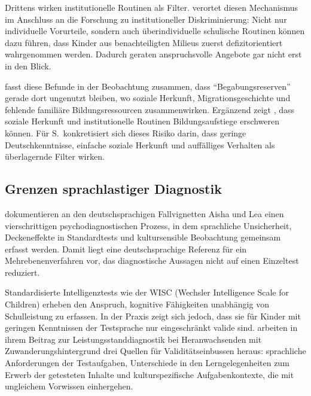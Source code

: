 \documentclass[ngerman, a4paper]{article}
\begin{document}
Drittens wirken institutionelle Routinen als Filter.
\textcite[S.\,58--62]{stamm2025vonuntennachoben} verortet diesen
Mechanismus im Anschluss an die Forschung zu institutioneller
Diskriminierung: Nicht nur individuelle Vorurteile, sondern auch
überindividuelle schulische Routinen können dazu führen, dass Kinder
aus benachteiligten Milieus zuerst defizitorientiert wahrgenommen
werden. Dadurch geraten anspruchsvolle Angebote gar nicht erst in den
Blick.

\textcite[S.\,576--585]{stamm2021fehlenderblick} fasst diese Befunde
in der Beobachtung zusammen, dass \enquote{Begabungsreserven} gerade
dort ungenutzt bleiben, wo soziale Herkunft, Migrationsgeschichte und
fehlende familiäre Bildungsressourcen zusammenwirken. Ergänzend zeigt
\textcite[S.\,36--37,\,58--62]{stamm2025vonuntennachoben}, dass
soziale Herkunft und institutionelle Routinen Bildungsaufstiege
erschweren können. Für S.\ konkretisiert sich dieses Risiko darin,
dass geringe Deutschkenntnisse, einfache soziale Herkunft und
auffälliges Verhalten als überlagernde Filter wirken.

\subsection{Grenzen sprachlastiger Diagnostik}

\textcite[S.\,239--249]{gauckreimann2021psychdiagnostik} dokumentieren an den
deutschsprachigen Fallvignetten Aisha und Lea einen vierschrittigen
psychodiagnostischen Prozess, in dem sprachliche Unsicherheit,
Deckeneffekte in Standardtests und kultursensible Beobachtung gemeinsam
erfasst werden. Damit liegt eine deutschsprachige Referenz für ein
Mehrebenenverfahren vor, das diagnostische Aussagen nicht auf einen
Einzeltest reduziert.

Standardisierte Intelligenztests wie der WISC (Wechsler Intelligence Scale
for Children) erheben den Anspruch, kognitive Fähigkeiten unabhängig von
Schulleistung zu erfassen. In der Praxis zeigt sich jedoch, dass sie für
Kinder mit geringen Kenntnissen der Testsprache nur eingeschränkt valide
sind. \textcite[S.\,153--165,\,187\,f.]{haag2018leistungsstanddiagnostik}
arbeiten in ihrem Beitrag zur Leistungsstanddiagnostik bei Heranwachsenden
mit Zuwanderungshintergrund drei Quellen für Validitätseinbussen heraus:
sprachliche Anforderungen der Testaufgaben, Unterschiede in den
Lerngelegenheiten zum Erwerb der getesteten Inhalte und kulturspezifische
Aufgabenkontexte, die mit ungleichem Vorwissen einhergehen.
\end{document}
